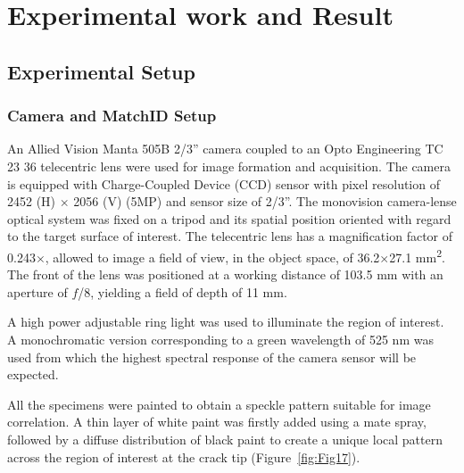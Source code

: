 \chapter{Experimental work and Result} %
\label{Chapter3} %


\section{Experimental Setup}


\subsection{Camera and MatchID Setup}

An Allied Vision Manta 505B 2/3'' camera coupled to an Opto Engineering TC 23 36 telecentric lens were used for image formation and acquisition. The camera is equipped with Charge-Coupled Device (CCD) sensor with pixel resolution of 2452 (H) $\times$ 2056 (V) (5MP) and sensor size of 2/3''. The monovision camera-lense optical system was fixed on a tripod and its spatial position oriented with regard to the target surface of interest. The telecentric lens has a magnification factor of \num{0.243}$\times$, allowed to image a field of view, in the object space, of 36.2$\times$27.1 \si{\milli\meter\squared}. The front of the lens was positioned at a working distance of 103.5 \si{\milli\meter} with an aperture of $f$/8, yielding a field of depth of 11 \si{\milli\meter}.

A high power adjustable ring light was used to illuminate the region of interest. A monochromatic version corresponding to a green wavelength of \num{525} \si{\nano\meter} was used from which the highest spectral response of the camera sensor will be expected.

All the specimens were painted to obtain a speckle pattern suitable for image correlation. A thin layer of white paint was firstly added using a mate spray, followed by a diffuse distribution of black paint to create a unique local pattern across the region of interest at the crack tip (Figure~\ref{fig:Fig17}).

